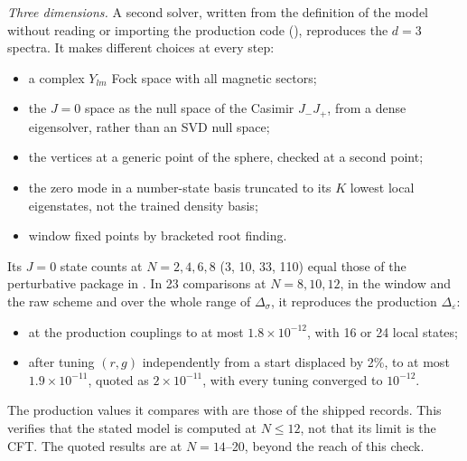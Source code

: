 \textit{Three dimensions.} A second solver, written from the definition of the model without reading or importing the
production code (), reproduces the $d=3$ spectra. It makes different choices at
every step:
\begin{itemize}
\item a complex $Y_{lm}$ Fock space with all magnetic sectors;
\item the $J=0$ space as the null space of the Casimir $J_-J_+$, from a dense eigensolver, rather than an SVD null space;
\item the vertices at a generic point of the sphere, checked at a second point;
\item the zero mode in a number-state basis truncated to its $K$ lowest local eigenstates, not the trained density
 basis;
\item window fixed points by bracketed root finding.
\end{itemize}

Its $J=0$ state counts at $N=2,4,6,8$ (3, 10, 33, 110) equal those of the perturbative package in
. %
In 23 comparisons at $N=8,10,12$, in the window and the raw scheme and over the whole range of $\Delta_\sigma$, it
reproduces the production $\Delta_\varepsilon$:
\begin{itemize}
\item at the production couplings to at most $1.8\times10^{-12}$, with 16 or 24 local states; %
\item after tuning $(r,g)$ independently from a start displaced by 2\%, to at most $1.9\times10^{-11}$, quoted as
 $2\times10^{-11}$, %
 with every tuning converged to $10^{-12}$. %
\end{itemize}
The production values it compares with are those of the shipped records. %
This verifies that the stated model is computed at $N\leq12$, not that its limit is the CFT. The quoted results are at
$N=14$--20, beyond the reach of this check.
